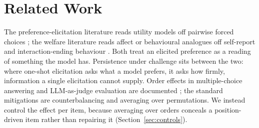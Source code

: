 \section{Related Work}
\label{sec:related}

The preference-elicitation literature reads utility models off pairwise forced choices
\citep{mazeika2025utility}; the welfare literature reads affect or behavioural
analogues off self-report and interaction-ending behaviour
\citep{anthropic2026emotions, anthropic2025endconv, ensign2025bail, lesswrong2025bail}.
Both treat an elicited preference as a reading of something the model has. Persistence
under challenge sits between the two: where one-shot elicitation asks what a model
prefers, it asks how firmly, information a single elicitation cannot supply. Order
effects in
multiple-choice answering and LLM-as-judge evaluation are documented
\citep{zheng2024selectors, pezeshkpour2023order, shi2025judging}; the standard
mitigations are counterbalancing and averaging over permutations. We instead control
the effect per item, because averaging over orders conceals a position-driven item
rather than repairing it (Section~\ref{sec:controls}).
